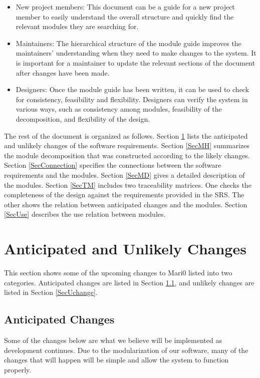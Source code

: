 \documentclass[12pt, titlepage]{article}
\begin{document}
\begin{itemize}
\item New project members: This document can be a guide for a new project member
  to easily understand the overall structure and quickly find the
  relevant modules they are searching for.
\item Maintainers: The hierarchical structure of the module guide improves the
  maintainers' understanding when they need to make changes to the system. It is
  important for a maintainer to update the relevant sections of the document
  after changes have been made.
\item Designers: Once the module guide has been written, it can be used to
  check for consistency, feasibility and flexibility. Designers can verify the
  system in various ways, such as consistency among modules, feasibility of the
  decomposition, and flexibility of the design.
\end{itemize}

The rest of the document is organized as follows. Section
\ref{SecChange} lists the anticipated and unlikely changes of the software
requirements. Section \ref{SecMH} summarizes the module decomposition that
was constructed according to the likely changes. Section \ref{SecConnection}
specifies the connections between the software requirements and the
modules. Section \ref{SecMD} gives a detailed description of the
modules. Section \ref{SecTM} includes two traceability matrices. One checks
the completeness of the design against the requirements provided in the SRS. The
other shows the relation between anticipated changes and the modules. Section
\ref{SecUse} describes the use relation between modules.

\section{Anticipated and Unlikely Changes} \label{SecChange}
This section shows some of the upcoming changes to Mari0 listed into two categories. 
Anticipated changes are listed in Section \ref{SecAchange}, and
unlikely changes are listed in Section \ref{SecUchange}.

\subsection{Anticipated Changes} \label{SecAchange}

Some of the changes below are what we believe will be implemented as development continues. Due to the modularization of our software, many of the changes that will happen will be simple and allow the system to function properly.
\end{document}
